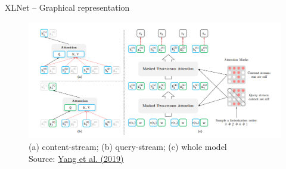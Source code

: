 \begin{frame}{XLNet -- Graphical representation}
	\begin{figure}
		\centering
		\includegraphics[width = 12cm]{figure/xlnet}\\ 
		{\tiny (a) content-stream; (b) query-stream; (c) whole model\\\footnotesize Source: \href{https://papers.nips.cc/paper/8812-xlnet-generalized-autoregressive-pretraining-for-language-understanding.pdf}{Yang et al. (2019)}}
	\end{figure}
\end{frame}


